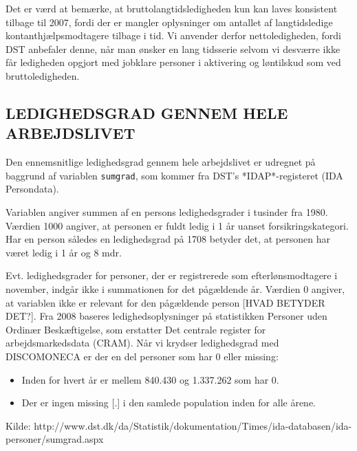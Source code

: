 Det er værd at bemærke, at bruttolangtidsledigheden kun kan laves konsistent tilbage til 2007, fordi der er mangler oplysninger om antallet af langtidsledige kontanthjælpsmodtagere tilbage i tid. Vi anvender derfor nettoledigheden, fordi DST anbefaler denne, når man ønsker en lang tidsserie selvom vi desværre ikke får ledigheden opgjort med jobklare personer i aktivering og løntilskud som ved bruttoledigheden.


\subsection{LEDIGHEDSGRAD GENNEM HELE ARBEJDSLIVET \label{}}

Den ennemsnitlige ledighedsgrad gennem hele arbejdslivet er udregnet på baggrund af variablen \texttt{sumgrad}, som kommer fra DST's *IDAP*-registeret (IDA Persondata).

Variablen angiver summen af en persons ledighedsgrader i tusinder fra 1980. Værdien 1000 angiver, at personen er fuldt ledig i 1 år uanset forsikringskategori. Har en person således en ledighedsgrad på 1708 betyder det, at personen har været ledig i 1 år og 8 mdr.

Evt. ledighedsgrader for personer, der er registrerede som efterlønsmodtagere i november, indgår ikke i summationen for det pågældende år. Værdien 0 angiver, at variablen ikke er relevant for den pågældende person [HVAD BETYDER DET?]. Fra 2008 baseres ledighedsoplysninger på statistikken Personer uden Ordinær Beskæftigelse, som erstatter Det centrale register for arbejdsmarkedsdata (CRAM).
% 
Når vi krydser ledighedsgrad med DISCOMONECA er der en del personer som har 0 eller missing:
% 
\begin{itemize} [topsep=6pt,itemsep=-1ex]
  \item Inden for hvert år er mellem 840.430 og 1.337.262 som har 0.
  \item Der er ingen missing [.] i den samlede population inden for alle årene.
\end{itemize}
%
Kilde: http://www.dst.dk/da/Statistik/dokumentation/Times/ida-databasen/ida-personer/sumgrad.aspx


